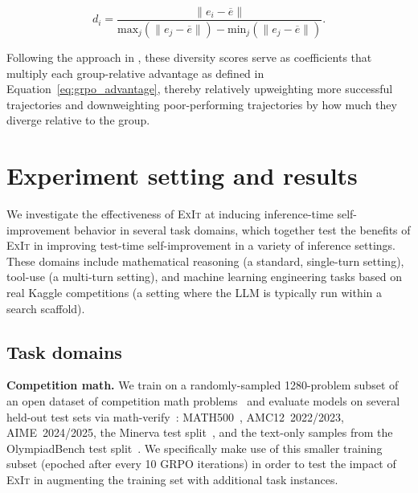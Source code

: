 \documentclass[10pt]{article} %
\newcommand{\methodname}{\textsc{ExIt}}
\begin{document}
\begin{equation}
    d_i = \frac{\|e_i - \overline{e}\|}{\text{max}_j(\|e_j - \overline{e}\|) - \text{min}_j (\|e_j - \overline{e}\|)}.
\end{equation}

Following the approach in \citet{chung2025modifying}, these diversity scores serve as coefficients that multiply each group-relative advantage as defined in Equation~\ref{eq:grpo_advantage}, thereby relatively upweighting more successful trajectories and downweighting poor-performing trajectories by how much they diverge relative to the group.

\section{Experiment setting and results}
\label{sec:experiment_results}

We investigate the effectiveness of \methodname{} at inducing inference-time self-improvement behavior in several task domains, which together test the benefits of \methodname{} in improving test-time self-improvement in a variety of inference settings. These domains include mathematical reasoning (a standard, single-turn setting), tool-use (a multi-turn setting), and machine learning engineering tasks based on real Kaggle competitions (a setting where the LLM is typically run within a search scaffold).

\subsection{Task domains}
\textbf{Competition math.} We train on a randomly-sampled 1280-problem subset of an open dataset of competition math problems~\citep{deepscaler2025, numina_math_datasets} and evaluate models on several held-out test sets via math-verify~\citep{math-verify}: MATH500~\citep{hendrycks2021measuring}, AMC12~2022/2023, AIME~2024/2025, the Minerva test split~\citep{lewkowycz2022solving}, and the text-only samples from the OlympiadBench test split~\citep{he2024olympiadbench}. We specifically make use of this smaller training subset (epoched after every 10 GRPO iterations) in order to test the impact of \methodname{} in augmenting the training set with additional task instances. 
\end{document}
